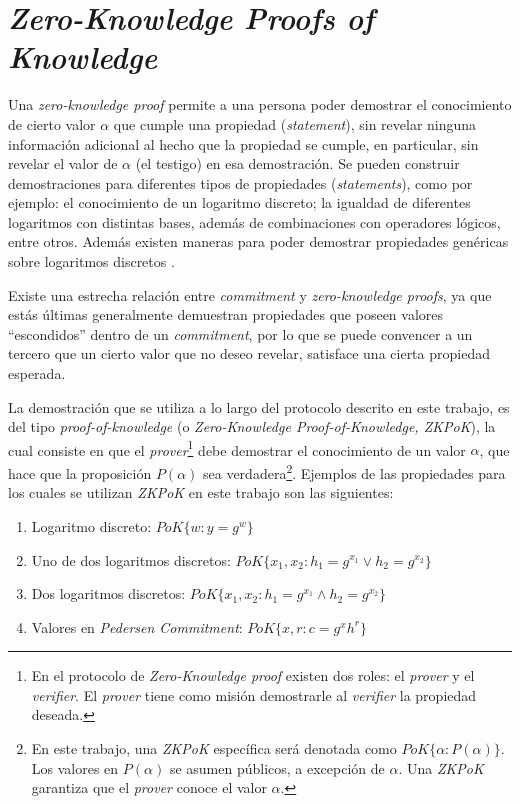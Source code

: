 \section{\emph{Zero-Knowledge Proofs of Knowledge}}

Una \emph{zero-knowledge proof} permite a una persona poder demostrar el 
conocimiento de cierto valor $\alpha$ que cumple una propiedad 
(\emph{statement}), sin revelar ninguna información adicional al hecho que la 
propiedad se cumple, en particular, sin revelar el valor de $\alpha$ (el 
testigo) en esa demostración.
Se pueden construir demostraciones para diferentes tipos de propiedades 
(\emph{statements}), como por ejemplo: el conocimiento de 
un logaritmo discreto; la igualdad de diferentes logaritmos con distintas 
bases, además de combinaciones con operadores 
lógicos, entre otros. Además existen maneras para poder demostrar propiedades 
genéricas sobre logaritmos discretos \cite{camenisch1997proof}.
  
Existe una estrecha relación entre \emph{commitment} y 
\emph{zero-knowledge proofs}, ya que estás últimas generalmente demuestran 
propiedades que poseen valores ``escondidos'' dentro de un \emph{commitment}, 
por lo que se puede convencer a un tercero que un cierto 
valor que no deseo revelar, satisface una cierta propiedad esperada.

La demostración que se utiliza a lo largo del protocolo descrito en este 
trabajo, es del tipo \emph{proof-of-knowledge} 
(o \emph{Zero-Knowledge Proof-of-Knowledge, ZKPoK}), la cual 
consiste en que el \emph{prover}\footnote{En el protocolo de 
\emph{Zero-Knowledge proof} existen dos roles: el \emph{prover} y el 
\emph{verifier}. El \emph{prover} tiene como misión demostrarle al 
\emph{verifier} la propiedad deseada.} debe demostrar el conocimiento de un 
valor $\alpha$, que hace que la proposición $P(\alpha)$ sea 
verdadera\footnote{En este trabajo, una \emph{ZKPoK} específica será denotada 
como $PoK\{\alpha : P(\alpha)\}$. 
Los valores en $P(\alpha)$ se asumen públicos, a excepción de $\alpha$. 
Una \emph{ZKPoK} garantiza que el \emph{prover} conoce el valor $\alpha$.}. 
Ejemplos de las propiedades para los cuales se utilizan \emph{ZKPoK} en este 
trabajo son las siguientes:
\begin{enumerate}
  \item Logaritmo discreto: 
  $PoK\{w : y = g^w\}$
  \item Uno de dos logaritmos discretos: 
  $PoK\{x_1, x_2 : h_1 = g^{x_1} \lor h_2 = g^{x_2}\}$
  \item Dos logaritmos discretos: 
  $PoK\{x_1, x_2 : h_1 = g^{x_1} \land h_2 = g^{x_2}\}$
  \item Valores en \emph{Pedersen Commitment}: 
  $PoK\{x, r : c = g^x h^r\}$
\end{enumerate}

